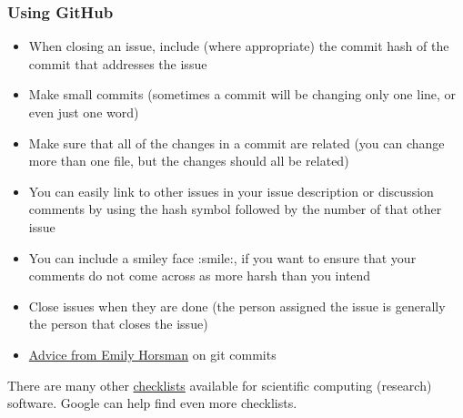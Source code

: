 \documentclass[12pt]{article}
\begin{document}
\subsubsection*{Using GitHub}

\begin{itemize}
  \item When closing an issue, include (where appropriate) the commit hash of the commit that addresses the
        issue
  \item Make small commits (sometimes a commit will be changing only one line, or even just one word)
  \item Make sure that all of the changes in a commit are related (you can change more than one file, but
        the changes should all be related)
  \item You can easily link to other issues in your issue description or discussion comments by using the
        hash symbol followed by the number of that other issue
  \item You can include a smiley face :smile:, if you want to ensure that your comments do not come across
        as more harsh than you intend
  \item Close issues when they are done (the person assigned the issue is generally the person that closes
        the issue) \item
        \href{https://gitlab.cas.mcmaster.ca/smiths/se2aa4_cs2me3/-/blob/master/FAQ/GitAdvice.txt} {Advice
          from Emily Horsman} on git commits
\end{itemize}

There are many other
\href{https://gitlab.cas.mcmaster.ca/SEforSC/se4sc/-/wikis/Advice-and-Checklists-for-Repos-(including-a-list-of-recommended-artifacts)}{checklists}
available for scientific computing (research) software. Google can help find even more checklists.
\end{document}
